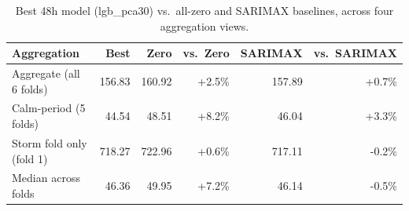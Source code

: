 \begin{table}[ht]
\centering
\caption{Best 48h model (lgb\_pca30) vs.\ all-zero and SARIMAX baselines, across four aggregation views.}
\label{tab:headline48}
\small
\begin{tabular}{lrrrrr}
\toprule
Aggregation & Best & Zero & vs.\ Zero & SARIMAX & vs.\ SARIMAX \\
\midrule
  Aggregate (all 6 folds) & 156.83 & 160.92 & +2.5\% & 157.89 & +0.7\% \\
  Calm-period (5 folds) & 44.54 & 48.51 & +8.2\% & 46.04 & +3.3\% \\
  Storm fold only (fold 1) & 718.27 & 722.96 & +0.6\% & 717.11 & -0.2\% \\
  Median across folds & 46.36 & 49.95 & +7.2\% & 46.14 & -0.5\% \\
\bottomrule
\end{tabular}
\end{table}

